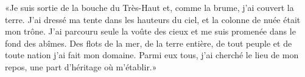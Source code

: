 «Je suis sortie de la bouche du Très-Haut
	et, comme la brume, j’ai couvert la terre.
J’ai dressé ma tente dans les hauteurs du ciel,
	et la colonne de nuée était mon trône.
J’ai parcouru seule la voûte des cieux
	et me suis promenée dans le fond des abîmes.
Des flots de la mer, de la terre entière,
	de tout peuple et de toute nation j’ai fait mon domaine.
Parmi eux tous, j’ai cherché le lieu de mon repos,
	une part d’héritage où m’établir.»
